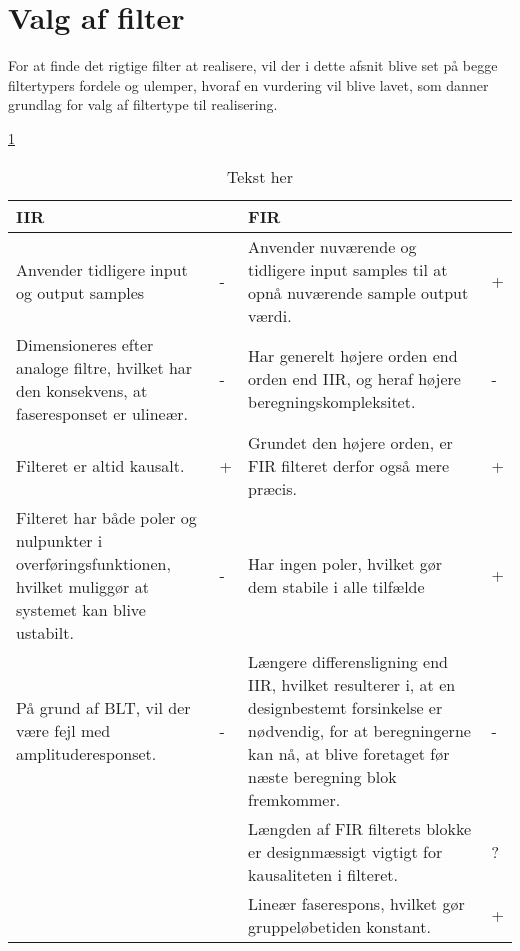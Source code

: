 \section{Valg af filter}\label{sec:dec_filter}
For at finde det rigtige filter at realisere, vil der i dette afsnit blive set på begge filtertypers fordele og ulemper, hvoraf en vurdering vil blive lavet, som danner grundlag for valg af filtertype til realisering.


\ref{tab:fir_iir_}




\begin{table}[h!]
	\centering
	\caption{Tekst her}
	\label{tab:fir_iir_}
\begin{tabular}{l l l l}
	\toprule
	IIR &  &FIR & \\
	\midrule 
	Anvender tidligere input og output samples & - & Anvender nuværende og tidligere input samples til at opnå nuværende sample output værdi. & + \\
	Dimensioneres efter analoge filtre, hvilket har den konsekvens, at faseresponset er ulineær. & - & Har generelt højere orden end orden end IIR, og heraf højere beregningskompleksitet. & - \\
	Filteret er altid kausalt. & + & Grundet den højere orden, er FIR filteret derfor også mere præcis. & + \\	
	Filteret har både poler og nulpunkter i overføringsfunktionen, hvilket muliggør at systemet kan blive ustabilt. & - & Har ingen poler, hvilket gør dem stabile i alle tilfælde & + \\
	På grund af BLT, vil der være fejl med amplituderesponset. & - & Længere differensligning end IIR, hvilket resulterer i, at en designbestemt forsinkelse er nødvendig, for at beregningerne kan nå, at blive foretaget før næste beregning blok fremkommer. & - \\
	& & Længden af FIR filterets blokke er designmæssigt vigtigt for kausaliteten i filteret. & ? \\
	& & Lineær faserespons, hvilket gør gruppeløbetiden konstant. & + \\
	\bottomrule
\end{tabular}
\end{table}
